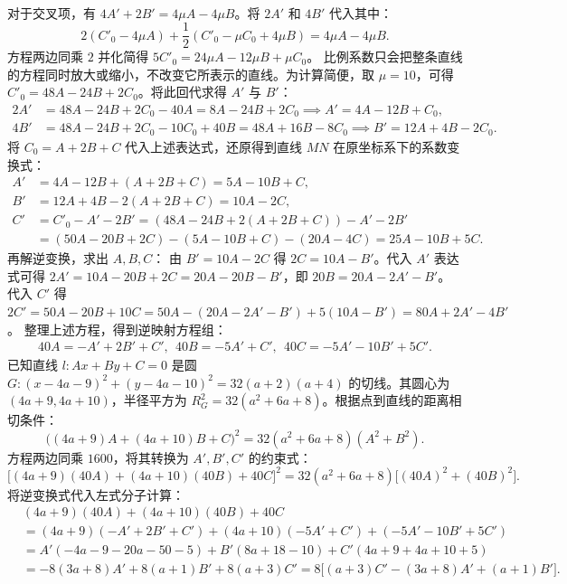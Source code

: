 \begin{solution}
\begin{align*}
\end{align*}
对于交叉项，有 $4A' + 2B' = 4\mu A - 4\mu B$。将 $2A'$ 和 $4B'$ 代入其中：
\[ 2(C'_0 - 4\mu A) + \frac{1}{2}(C'_0 - \mu C_0 + 4\mu B) = 4\mu A - 4\mu B. \]
方程两边同乘 $2$ 并化简得 $5C'_0 = 24\mu A - 12\mu B + \mu C_0$。
比例系数只会把整条直线的方程同时放大或缩小，不改变它所表示的直线。为计算简便，取 $\mu = 10$，可得 $C'_0 = 48A - 24B + 2C_0$。将此回代求得 $A'$ 与 $B'$：
\begin{align*}
2A' &= 48A - 24B + 2C_0 - 40A = 8A - 24B + 2C_0 \implies A' = 4A - 12B + C_0, \\
4B' &= 48A - 24B + 2C_0 - 10C_0 + 40B = 48A + 16B - 8C_0 \implies B' = 12A + 4B - 2C_0.
\end{align*}
将 $C_0 = A + 2B + C$ 代入上述表达式，还原得到直线 $MN$ 在原坐标系下的系数变换式：
\begin{align*}
A' &= 4A - 12B + (A + 2B + C) = 5A - 10B + C, \\
B' &= 12A + 4B - 2(A + 2B + C) = 10A - 2C, \\
C' &= C'_0 - A' - 2B' = (48A - 24B + 2(A + 2B + C)) - A' - 2B' \\
   &= (50A - 20B + 2C) - (5A - 10B + C) - (20A - 4C) = 25A - 10B + 5C.
\end{align*}
再解逆变换，求出 $A, B, C$：
由 $B' = 10A - 2C$ 得 $2C = 10A - B'$。代入 $A'$ 表达式可得 $2A' = 10A - 20B + 2C = 20A - 20B - B'$，即 $20B = 20A - 2A' - B'$。
代入 $C'$ 得 $2C' = 50A - 20B + 10C = 50A - (20A - 2A' - B') + 5(10A - B') = 80A + 2A' - 4B'$。
整理上述方程，得到逆映射方程组：
\begin{align*}
40A = -A' + 2B' + C',~~ 40B = -5A' + C', ~~40C = -5A' - 10B' + 5C'.
\end{align*}
已知直线 $l: Ax + By + C = 0$ 是圆 $G: (x - 4a - 9)^2 + (y - 4a - 10)^2 = 32(a+2)(a+4)$ 的切线。其圆心为 $(4a+9, 4a+10)$，半径平方为 $R_G^2 = 32(a^2+6a+8)$。根据点到直线的距离相切条件：
\[ \big( (4a+9)A + (4a+10)B + C \big)^2 = 32(a^2+6a+8)(A^2 + B^2). \]
方程两边同乘 $1600$，将其转换为 $A', B', C'$ 的约束式：
\[ \big[ (4a+9)(40A) + (4a+10)(40B) + 40C \big]^2 = 32(a^2+6a+8)\big[ (40A)^2 + (40B)^2 \big]. \]
将逆变换式代入左式分子计算：
\begin{align*}
&(4a+9)(40A) + (4a+10)(40B) + 40C \\
&= (4a+9)(-A' + 2B' + C') + (4a+10)(-5A' + C') + (-5A' - 10B' + 5C') \\
&= A'(-4a-9-20a-50-5) + B'(8a+18-10) + C'(4a+9+4a+10+5) \\
&= -8(3a+8)A' + 8(a+1)B' + 8(a+3)C' = 8\big[ (a+3)C' - (3a+8)A' + (a+1)B' \big].

\end{align*}
\end{solution}
